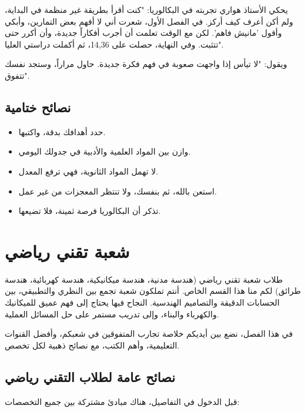 \documentclass[12pt,a4paper]{book}
\begin{document}
يحكي الأستاذ هواري تجربته في البكالوريا: "كنت أقرأ بطريقة غير منظمة في البداية، ولم أكن أعرف كيف أركز. في الفصل الأول، شعرت أني لا أفهم بعض التمارين، وأبكي وأقول 'مانيش فاهم'. لكن مع الوقت تعلمت أن أجرب أفكاراً جديدة، وأن أكرر حتى تتثبت. وفي النهاية، حصلت على 14,36، ثم أكملت دراستي العليا".

ويقول: "لا تيأس إذا واجهت صعوبة في فهم فكرة جديدة. حاول مراراً، وستجد نفسك تتفوق".

\subsection{نصائح ختامية}
\label{sec:random-tips17}

\begin{itemize}
	\item حدد أهدافك بدقة، واكتبها.
	\item وازن بين المواد العلمية والأدبية في جدولك اليومي.
	\item لا تهمل المواد الثانوية، فهي ترفع المعدل.
	\item استعن بالله، ثم بنفسك، ولا تنتظر المعجزات من غير عمل.
	\item تذكر أن البكالوريا فرصة ثمينة، فلا تضيعها.
\end{itemize}

\section{شعبة تقني رياضي}

طلاب شعبة تقني رياضي (هندسة مدنية، هندسة ميكانيكية، هندسة كهربائية، هندسة طرائق) لكم منا هذا القسم الخاص. أنتم تملكون شعبة تجمع بين النظري والتطبيقي، بين الحسابات الدقيقة والتصاميم الهندسية. النجاح فيها يحتاج إلى فهم عميق للميكانيك والكهرباء والبناء، وإلى تدريب مستمر على حل المسائل العملية.

في هذا الفصل، نضع بين أيديكم خلاصة تجارب المتفوقين في شعبكم، وأفضل القنوات التعليمية، وأهم الكتب، مع نصائح ذهبية لكل تخصص.

\subsection{نصائح عامة لطلاب التقني رياضي}

قبل الدخول في التفاصيل، هناك مبادئ مشتركة بين جميع التخصصات:
\end{document}
